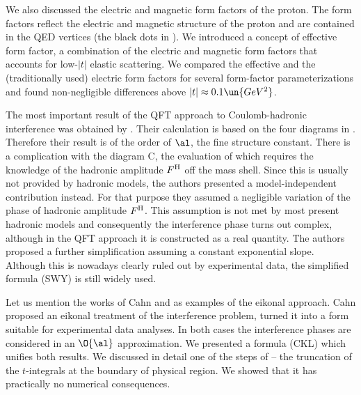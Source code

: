 
We also discussed the electric and magnetic form factors of the proton. The form factors reflect the electric and magnetic structure of the proton and are contained in the QED vertices (the black dots in ). We introduced a concept of effective form factor, a combination of the electric and magnetic form factors that accounts for low-$|t|$ elastic scattering. We compared the effective and the (traditionally used) electric form factors for several form-factor parameterizations and found non-negligible differences above $|t| \approx 0.1\un{GeV^2}$.

The most important result of the QFT approach to Coulomb-hadronic interference was obtained by \WaY{} . Their calculation is based on the four diagrams in . Therefore their result is of the order of $\al$, the fine structure constant. There is a complication with the diagram C, the evaluation of which requires the knowledge of the hadronic amplitude $F^{\rm H}$ off the mass shell. Since this is usually not provided by hadronic models, the authors presented a model-independent contribution instead. For that purpose they assumed a negligible variation of the phase of hadronic amplitude $F^{\rm H}$. This assumption is not met by most present hadronic models and consequently the interference phase turns out complex, although in the QFT approach it is constructed as a real quantity. The authors proposed a further simplification assuming a constant exponential slope. Although this is nowadays clearly ruled out by experimental data, the simplified \WY{} formula (SWY) is still widely used.

Let us mention the works of Cahn  and \KaL{}  as examples of the eikonal approach. Cahn proposed an eikonal treatment of the interference problem, \KaL{} turned it into a form suitable for experimental data analyses. In both cases the interference phases are considered in an $\O{\al}$ approximation. We presented a formula (CKL) which unifies both results. We discussed in detail one of the steps of \KaL{} -- the truncation of the $t$-integrals at the boundary of physical region. We showed that it has practically no numerical consequences.

